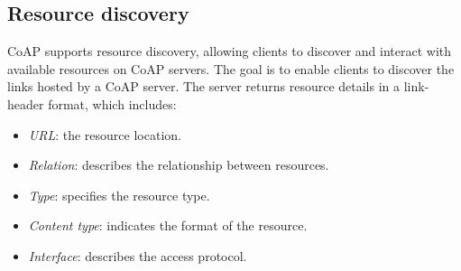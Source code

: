 \subsection{Resource discovery}
CoAP supports resource discovery, allowing clients to discover and interact with available resources on CoAP servers.
The goal is to enable clients to discover the links hosted by a CoAP server.
The server returns resource details in a link-header format, which includes:
\begin{itemize}
    \item \textit{URL}: the resource location.
    \item \textit{Relation}: describes the relationship between resources.
    \item \textit{Type}: specifies the resource type.
    \item \textit{Content type}: indicates the format of the resource.
    \item \textit{Interface}: describes the access protocol.
\end{itemize}